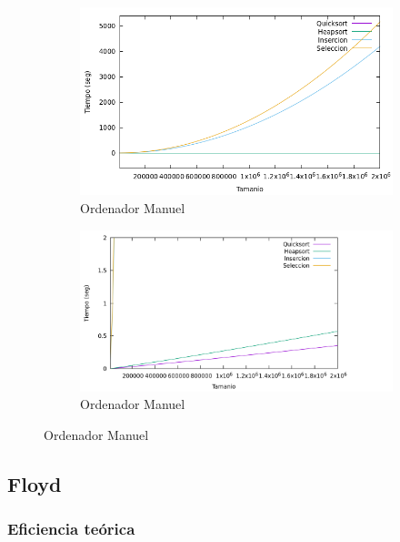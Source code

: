 \documentclass[10pt,a4paper]{article}
\begin{document}
\begin{figure}[h!]
	\begin{subfigure}{.5\textwidth}
		\centering
		\includegraphics[scale=0.35]{../../Images/Gráfica comparativa algoritmos ordenación ManuelMoya.png}
		\caption{Ordenador Manuel}
	\end{subfigure}
	\hfill
	\begin{subfigure}{.5\textwidth}
		\centering
		\includegraphics[scale=0.15]{../../Images/Gráfica comparativa algoritmos ordenación ManuelMoya (H y Q).png}
		\caption{Ordenador Manuel}
	\end{subfigure}
\end{figure}

\subsection{Floyd}


\subsubsection{Eficiencia teórica}
\end{document}
